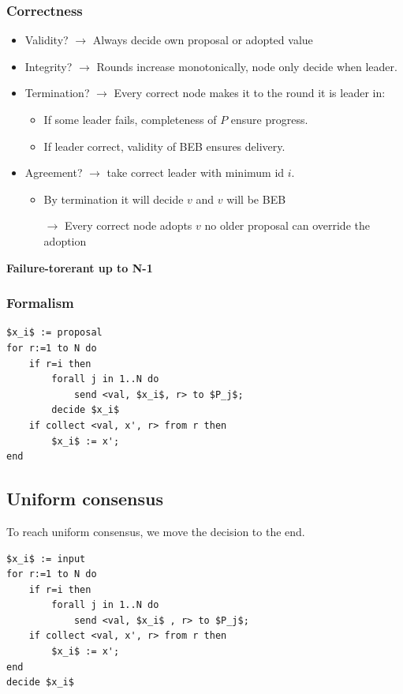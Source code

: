 \subsubsection{Correctness}
\begin{itemize}
	\item Validity? $\to$ Always decide own proposal or adopted value
	\item Integrity? $\to$ Rounds increase monotonically, node only
	decide when leader.
	\item Termination? $\to$ Every correct node makes it to the round it
	is leader in:
	\begin{itemize}
		\item If some leader fails, completeness of $P$ ensure progress.
		\item If leader correct, validity of BEB ensures delivery.
	\end{itemize}
	\item Agreement? $\to$ take correct leader with minimum id $i$.
        \begin{itemize}
            \item By termination it will decide $v$ and $v$ will be BEB
            \item[$\to$] Every correct node adopts $v$ no older proposal
                can override the adoption
        \end{itemize}
\end{itemize}

\textbf{Failure-torerant up to N-1}

\subsubsection{Formalism}
\begin{lstlisting}[caption={Hierarchical consensus}, mathescape]
$x_i$ := proposal
for r:=1 to N do
    if r=i then
        forall j in 1..N do
            send <val, $x_i$, r> to $P_j$;
        decide $x_i$
    if collect <val, x', r> from r then
        $x_i$ := x';
end
\end{lstlisting}

\subsection{Uniform consensus}
To reach uniform consensus, we move the decision to the end.

\begin{lstlisting}[caption={Uniform Hierarchical consensus with P}, mathescape]
$x_i$ := input
for r:=1 to N do
    if r=i then
        forall j in 1..N do
            send <val, $x_i$ , r> to $P_j$;
    if collect <val, x', r> from r then
        $x_i$ := x';
end
decide $x_i$
\end{lstlisting}

